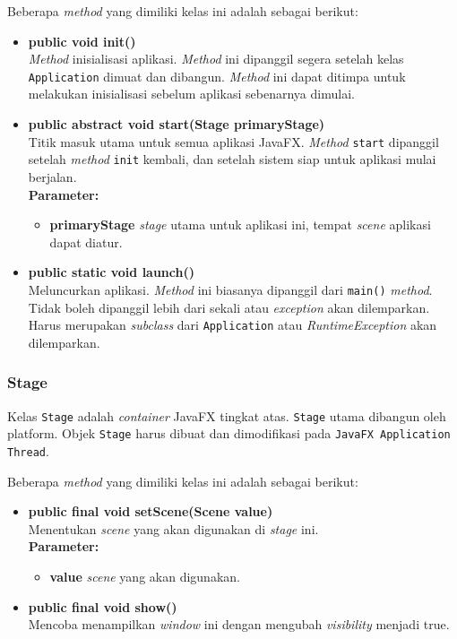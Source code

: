 Beberapa \textit{method} yang dimiliki kelas ini adalah sebagai berikut:
\begin{itemize}
	\item \textbf{public void init()}\\
	\textit{Method} inisialisasi aplikasi. \textit{Method} ini dipanggil segera setelah kelas \texttt{Application} dimuat dan dibangun. \textit{Method} ini dapat ditimpa untuk melakukan inisialisasi sebelum aplikasi sebenarnya dimulai.
	
	\item \textbf{public abstract void start(Stage primaryStage)}\\
	Titik masuk utama untuk semua aplikasi JavaFX. \textit{Method} \texttt{start} dipanggil setelah \textit{method} \texttt{init} kembali, dan setelah sistem siap untuk aplikasi mulai berjalan.\\
	\textbf{Parameter:}
	\begin{itemize}
		\item \textbf{primaryStage} \textit{stage} utama untuk aplikasi ini, tempat \textit{scene} aplikasi dapat diatur.
	\end{itemize}
	
	\item \textbf{public static void launch()}\\
    Meluncurkan aplikasi. \textit{Method} ini biasanya dipanggil dari \texttt{main()} \textit{method}. Tidak boleh dipanggil lebih dari sekali atau \textit{exception} akan dilemparkan. Harus merupakan \textit{subclass} dari \texttt{Application} atau \textit{RuntimeException} akan dilemparkan.\\
\end{itemize}


\subsubsection{Stage}
Kelas \texttt{Stage} adalah \textit{container} JavaFX tingkat atas. \texttt{Stage} utama dibangun oleh platform. Objek \texttt{Stage} harus dibuat dan dimodifikasi pada \texttt{JavaFX Application Thread}.

Beberapa \textit{method} yang dimiliki kelas ini adalah sebagai berikut:
\begin{itemize}
	\item \textbf{public final void setScene(Scene value)}\\
	Menentukan \textit{scene} yang akan digunakan di \textit{stage} ini.\\
	\textbf{Parameter:}
	\begin{itemize}
		\item \textbf{value} \textit{scene} yang akan digunakan.
	\end{itemize}
	
	\item \textbf{public final void show()}\\
	Mencoba menampilkan \textit{window} ini dengan mengubah \textit{visibility} menjadi true.
\end{itemize}


